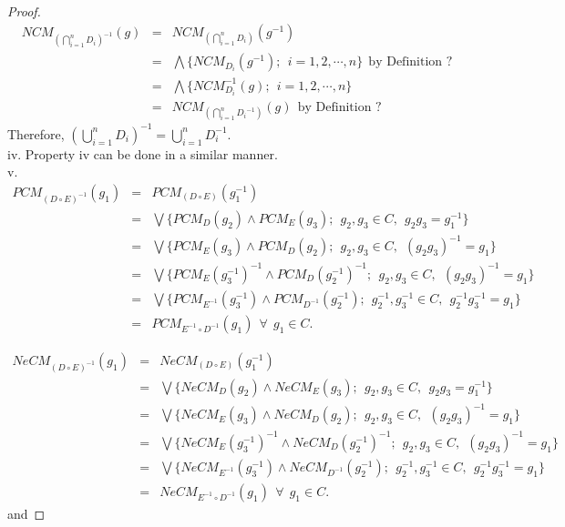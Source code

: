 \documentclass[10pt,a4paper]{amsart}
\newcommand{\dis}{\displaystyle}
\begin{document}
\begin{proof}
\begin{eqnarray*}
NCM_{\dis \left(\bigcap^n_{i = 1} D_i\right)^{-1}}(g) & = & NCM_{\dis \left(\bigcap^n_{i = 1} D_i\right)}(g^{-1})\\
& = & \bigwedge \lbrace  NCM_{D_i}(g^{-1});~~ i = 1, 2, \cdots, n \rbrace~~ \text{by~Definition ?} \\
& = & \bigwedge \lbrace  NCM_{D_i}^{-1}(g);~~ i = 1, 2, \cdots, n \rbrace\\
& = & NCM_{\dis \left(\bigcap^n_{i = 1} {D_i}^{-1}\right)}(g)~~ \text{by~Definition ?}
\end{eqnarray*}
Therefore, $ \dis \left(\bigcup^n_{i = 1} D_i\right)^{-1} = \bigcup^n_{i = 1} D_i^{-1}.$\\

iv. Property iv can be done in a similar manner.\\

v.
\begin{eqnarray*}
PCM_{ (D \circ E)^{-1}}(g_1) & = & PCM_{ (D \circ E)}(g^{-1}_1)\\
& = & \bigvee \lbrace  PCM_{D}(g_2) \wedge PCM_{E}(g_3);~~ g_2, g_3 \in C,~~ g_2g_3 = g_1^{-1} \rbrace \\
& = & \bigvee \lbrace  PCM_{E}(g_3) \wedge PCM_{D}(g_2);~~ g_2, g_3 \in C,~~ (g_2g_3)^{-1} = g_1 \rbrace\\
& = & \bigvee \lbrace  PCM_{E}(g^{-1}_3)^{-1} \wedge PCM_{D}(g^{-1}_2)^{-1};~~ g_2, g_3 \in C,~~ (g_2g_3)^{-1} = g_1 \rbrace\\
& = & \bigvee \lbrace  PCM_{E^{-1}}(g^{-1}_3) \wedge PCM_{D^{-1}}(g^{-1}_2);~~ g^{-1}_2, g^{-1}_3 \in C,~~ g^{-1}_2g^{-1}_3 = g_1 \rbrace\\
& = & PCM_{E^{-1} \circ D^{-1}}(g_1)~~ \forall~~ g_1 \in C.
\end{eqnarray*}

\begin{eqnarray*}
NeCM_{ (D \circ E)^{-1}}(g_1) & = & NeCM_{ (D \circ E)}(g^{-1}_1)\\
& = & \bigvee \lbrace  NeCM_{D}(g_2) \wedge NeCM_{E}(g_3);~~ g_2, g_3 \in C,~~ g_2g_3 = g_1^{-1} \rbrace \\
& = & \bigvee \lbrace  NeCM_{E}(g_3) \wedge NeCM_{D}(g_2);~~ g_2, g_3 \in C,~~ (g_2g_3)^{-1} = g_1 \rbrace\\
& = & \bigvee \lbrace  NeCM_{E}(g^{-1}_3)^{-1} \wedge NeCM_{D}(g^{-1}_2)^{-1};~~ g_2, g_3 \in C,~~ (g_2g_3)^{-1} = g_1 \rbrace\\
& = & \bigvee \lbrace  NeCM_{E^{-1}}(g^{-1}_3) \wedge NeCM_{D^{-1}}(g^{-1}_2);~~ g^{-1}_2, g^{-1}_3 \in C,~~ g^{-1}_2g^{-1}_3 = g_1 \rbrace\\
& = & NeCM_{E^{-1} \circ D^{-1}}(g_1)~~ \forall~~ g_1 \in C.
\end{eqnarray*}
and 


\end{proof}
\end{document}
